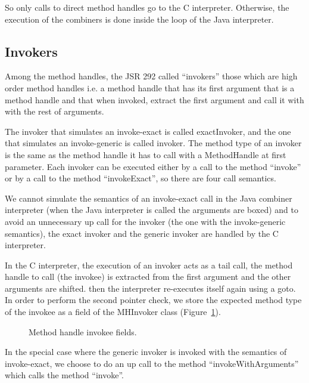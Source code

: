 \documentclass{sig-alternate}
\def \Jsr{JSR\xspace}
\def \JSR{\Jsr 292\xspace}
\begin{document}
      So only calls to direct method handles go to the C interpreter.
      Otherwise, the execution of the combiners is done inside the loop of the Java interpreter.

    \subsection{Invokers}
     \label{invokers}

      Among the method handles, the \JSR called ``invokers'' those which are high order method handles i.e.
      a method handle that has its first argument that is a method handle and that when invoked,
      extract the first argument and call it with with the rest of arguments.

      The invoker that simulates an invoke-exact is called exactInvoker, and the one that simulates
      an invoke-generic is called invoker. The method type of an invoker is the same as the method handle
      it has to call with a MethodHandle at first parameter.
      Each invoker can be executed either by a call to the method ``invoke'' or by a call to the method ``invokeExact'',
      so there are four call semantics.
      
      We cannot simulate the semantics of an invoke-exact call in the Java combiner interpreter
      (when the Java interpreter is called the arguments are boxed) and to avoid an unnecessary up call
      for the invoker (the one with the invoke-generic semantics), the exact invoker and the generic invoker
      are handled by the C interpreter.
      
      In the C interpreter, the execution of an invoker acts as a tail call,
      the method handle to call (the invokee) is extracted from the first argument and the other arguments are shifted.
      then the interpreter re-executes itself again using a goto.
      In order to perform the second pointer check, we store the expected method type of the invokee as a field of the MHInvoker class
      (Figure~\ref{invokeeFields}).

      \begin{figure}[!ht]
        \centering \vspace{-1.5em}
        \caption{Method handle invokee fields.}
        \label{invokeeFields}
      \end{figure}

      In the special case where the generic invoker is invoked with the semantics of invoke-exact,
      we choose to do an up call to the method ``invokeWithArguments'' which calls the method ``invoke''.
\end{document}
